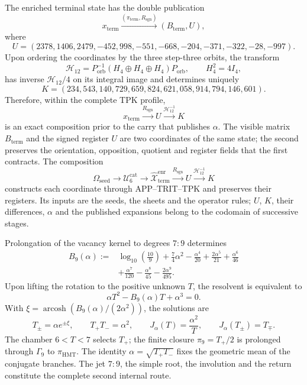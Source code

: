 \begin{proposition}
\label{prop:c27-registro-u-k-producido}
The enriched terminal state has the double publication
\[
x_{\mathrm{term}}
\xrightarrow{(\pi_{\mathrm{term}},R_{\mathrm{sgn}})}
(B_{\mathrm{term}},U),
\]
where
\[
U=(2378,1406,2479,-452,998,-551,
-668,-204,-371,-322,-28,-997).
\]
Upon ordering the coordinates by the three step-three orbits, the transform
\[
\mathcal H_{12}
=P_{\mathrm{orb}}^{-1}(H_4\oplus H_4\oplus H_4)P_{\mathrm{orb}},
\qquad H_4^2=4I_4,
\]
has inverse \(\mathcal H_{12}/4\) on its integral image and determines
uniquely
\[
K=(234,543,140,729,659,824,621,058,914,794,146,601).
\]
Therefore, within the complete TPK profile,
\[
x_{\mathrm{term}}\xrightarrow{R_{\mathrm{sgn}}}U
\xrightarrow{\mathcal H_{12}^{-1}}K
\]
is an exact composition prior to the carry that publishes \(\alpha\). The visible
matrix \(B_{\mathrm{term}}\) and the signed register \(U\) are two
coordinates of the same state; the second preserves the orientation,
opposition, quotient and register fields that the first contracts. The composition
\[
 \Omega_{\mathrm{seed}}\longrightarrow
 \mathcal U_6^{\mathrm{cat}}\longrightarrow
 \widehat{\mathcal X}^{\mathrm{enr}}_{\mathrm{term}}
 \xrightarrow{R_{\mathrm{sgn}}}U
 \xrightarrow{\mathcal H_{12}^{-1}}K
\]
constructs each coordinate through APP--TRIT--TPK and preserves their registers. Its
inputs are the seeds, the sheets and the operator rules; \(U\), \(K\),
their differences, \(\alpha\) and the published expansions belong to the
codomain of successive stages.
\end{proposition}

\begin{theorem}
\label{thm:c27-alpha-segunda-via-bidireccional}
Prolongation of the vacancy kernel to degrees \(7{:}9\) determines
\[
\begin{aligned}
B_9(\alpha):={}&\log_{10}\!\left(\frac{10}{9}\right)
+\frac74\alpha^2-\frac{\alpha^4}{20}
+\frac{2\alpha^5}{21}+\frac{\alpha^6}{46}\\
&+\frac{\alpha^7}{120}-\frac{\alpha^8}{45}
-\frac{2\alpha^9}{495}.
\end{aligned}
\]
Upon lifting the rotation to the positive unknown \(T\), the resolvent is equivalent to
\[
\boxed{\alpha T^2-B_9(\alpha)T+\alpha^3=0.}
\]
With
\(\xi=\operatorname{arcosh}(B_9(\alpha)/(2\alpha^2))\), the solutions are
\[
T_\pm=\alpha e^{\pm\xi},
\qquad T_+T_-=\alpha^2,
\qquad
J_\alpha(T)=\frac{\alpha^2}{T},
\qquad J_\alpha(T_\pm)=T_\mp.
\]
The chamber \(6<T<7\) selects \(T_+\); the finite closure
\(\pi_9=T_+/2\) is prolonged through \(\Gamma_9\) to
\(\pi_{\mathrm{HMT}}\). The identity
\(\alpha=\sqrt{T_+T_-}\) fixes the geometric mean of the conjugate branches.
The jet \(7{:}9\), the simple root, the involution and the return constitute the
complete second internal route.
\end{theorem}

